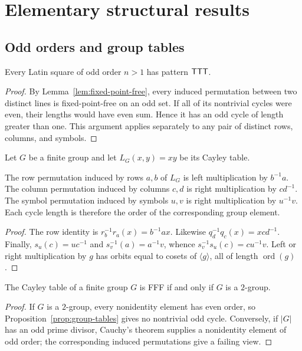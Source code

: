 \section{Elementary structural results}

\subsection{Odd orders and group tables}

\begin{proposition}\label{prop:odd-order}
Every Latin square of odd order $n>1$ has pattern $\mathsf{TTT}$.
\end{proposition}

\begin{proof}
By Lemma~\ref{lem:fixed-point-free}, every induced permutation between two
distinct lines is fixed-point-free on an odd set.  If all of its nontrivial
cycles were even, their lengths would have even sum.  Hence it has an odd
cycle of length greater than one.  This argument applies separately to any
pair of distinct rows, columns, and symbols.
\end{proof}

Let $G$ be a finite group and let $L_G(x,y)=xy$ be its Cayley table.

\begin{proposition}\label{prop:group-tables}
The row permutation induced by rows $a,b$ of $L_G$ is left multiplication by
$b^{-1}a$.  The column permutation induced by columns $c,d$ is right
multiplication by $cd^{-1}$.  The symbol permutation induced by symbols
$u,v$ is right multiplication by $u^{-1}v$.  Each cycle length is therefore
the order of the corresponding group element.
\end{proposition}

\begin{proof}
The row identity is
$r_b^{-1}r_a(x)=b^{-1}ax$.  Likewise
$q_d^{-1}q_c(x)=xcd^{-1}$.  Finally, $s_u(c)=uc^{-1}$ and
$s_v^{-1}(a)=a^{-1}v$, whence
$s_v^{-1}s_u(c)=cu^{-1}v$.  Left or right multiplication by $g$ has orbits
equal to cosets of $\langle g\rangle$, all of length $\operatorname{ord}(g)$.
\end{proof}

\begin{corollary}\label{cor:group-fff}
The Cayley table of a finite group $G$ is FFF if and only if $G$ is a
$2$-group.
\end{corollary}

\begin{proof}
If $G$ is a $2$-group, every nonidentity element has even order, so
Proposition~\ref{prop:group-tables} gives no nontrivial odd cycle.  Conversely,
if $|G|$ has an odd prime divisor, Cauchy's theorem supplies a nonidentity
element of odd order; the corresponding induced permutations give a failing
view.
\end{proof}

